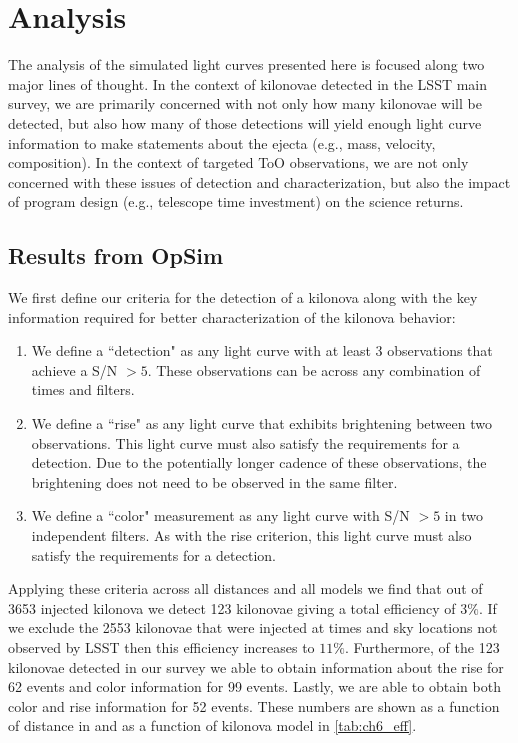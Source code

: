 \section{Analysis}
\label{sec:ch6_analysis}
The analysis of the simulated light curves presented here is focused along two major lines of thought. In the context of kilonovae detected in the LSST main survey, we are primarily concerned with not only how many kilonovae will be detected, but also how many of those detections will yield enough light curve information to make statements about the ejecta (e.g., mass, velocity, composition). In the context of targeted ToO observations, we are not only concerned with these issues of detection and characterization, but also the impact of program design (e.g., telescope time investment) on the science returns.

\subsection{Results from OpSim}
\label{sec:ch6_opsim_results}
We first define our criteria for the detection of a kilonova along with the key information required for better characterization of the kilonova behavior:
\begin{enumerate}
\item We define a ``detection" as any light curve with at least 3 observations that achieve a S/N $> 5$. These observations can be across any combination of times and filters.
\item We define a ``rise" as any light curve that exhibits brightening between two observations. This light curve must also satisfy the requirements for a detection. Due to the potentially longer cadence of these observations, the brightening does not need to be observed in the same filter.
\item We define a ``color" measurement as any light curve with S/N $> 5$ in two independent filters. As with the rise criterion, this light curve must also satisfy the requirements for a detection.
\end{enumerate}

Applying these criteria across all distances and all models we find that out of 3653 injected kilonova we detect 123 kilonovae giving a total efficiency of $3\%$. If we exclude the 2553 kilonovae that were injected at times and sky locations not observed by LSST then this efficiency increases to $11\%$. Furthermore, of the 123 kilonovae detected in our survey we able to obtain information about the rise for 62 events and color information for 99 events. Lastly, we are able to obtain both color and rise information for 52 events. These numbers are shown as a function of distance in  and as a function of kilonova model in \cref{tab:ch6_eff}.

